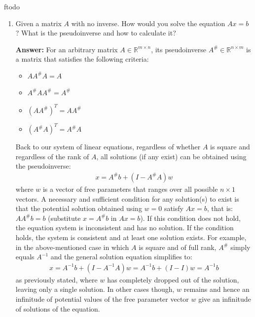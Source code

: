 ƒtodo\documentclass{article}
\newenvironment{QandA}{\begin{enumerate}[label=\arabic*.]}{\end{enumerate}}
\newenvironment{InnerQandA}{\begin{enumerate}[label=\roman*.]}{\end{enumerate}}
\newenvironment{answer}{\par\normalfont \textbf{Answer:}}{}
\newcommand{\R}{\mathbb{R}}
\begin{document}
\begin{QandA}
\begin{InnerQandA}
        \item Given a matrix $A$ with no inverse. How would you solve the equation $Ax=b$ ? What is the pseudoinverse and how to calculate it?
        \begin{answer}
            For an arbitrary matrix $A \in \R^{m \times n}$, its pseudoinverse $A^{\#} \in \R^{n \times m}$ is a matrix that satisfies the following criteria:
            \begin{itemize}
                \item $A A^{\#} A = A$
                \item $A^{\#} A A^{\#} = A^{\#}$
                \item $(A A^{\#})^T = A A^{\#}$
                \item $(A^{\#} A)^T = A^{\#} A$
            \end{itemize}
            Back to our system of linear equations, regardless of whether $A$ is square and regardless of the rank of $A$, all solutions (if any exist) can be obtained using the pseudoinverse:
            \begin{align*}
                x = A^{\#} b + (I - A^{\#}A)w
            \end{align*}
            where $w$ is a vector of free parameters that ranges over all possible $n \times 1$ vectors. A necessary and sufficient condition for any solution(s) to exist is that the potential solution obtained using $w=0$ satisfy $Ax = b$, that is: $A A^{\#}b = b$ (substitute $x = A^\# b$ in $Ax = b$). If this condition does not hold, the equation system is inconsistent and has no solution. If the condition holds, the system is consistent and at least one solution exists. For example, in the above-mentioned case in which $A$ is square and of full rank, $A^{\#}$ simply equals $A^{-1}$ and the general solution equation simplifies to:
            \begin{align*}
                x = A^{-1}b + (I - A^{-1}A)w = A^{-1}b + (I - I)w = A^{-1}b
            \end{align*}
            as previously stated, where $w$ has completely dropped out of the solution, leaving only a single solution. In other cases though, $w$ remains and hence an infinitude of potential values of the free parameter vector $w$ give an infinitude of solutions of the equation.
        \end{answer}
    \end{InnerQandA}
    

\end{QandA}
\end{document}
